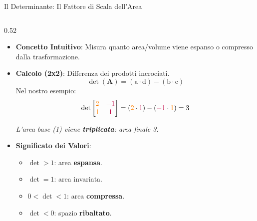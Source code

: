 \documentclass[aspectratio=169, 10pt]{beamer}
\begin{document}
\begin{frame}{Il Determinante: Il Fattore di Scala dell'Area}
    \begin{columns}[T] %
        
        \begin{column}{0.52\textwidth}
            \scriptsize
            \setlength\itemsep{0.2em}
            
            \begin{itemize}
                \item \textbf{Concetto Intuitivo}: 
                Misura quanto area/volume viene espanso o compresso dalla trasformazione.
                
                \item \textbf{Calcolo (2x2)}: 
                Differenza dei prodotti incrociati.
                \[
                    \det(\mathbf{A}) = (\text{a} \cdot \text{d}) - (\text{b} \cdot \text{c})
                \]
                \vspace{-0.45cm}
                Nel nostro esempio:
                \[
                \det\begin{bmatrix} \color{orange}2 & \color{purple}-1 \\ \color{orange}1 & \color{purple}1 \end{bmatrix}
                = (\color{orange}2\color{black}\cdot\color{purple}1\color{black}) - (\color{purple}-1\color{black}\cdot\color{orange}1\color{black})
                = 3
                \]
                
                \vspace{-0.25cm}
                \textit{L'area base (1) viene \textbf{triplicata}: area finale 3.}
                
                \item \textbf{Significato dei Valori}:
                \begin{itemize}
                    \setlength\itemsep{0.05em}
                    \item $\det > 1$: area \textbf{espansa}.
                    \item $\det = 1$: area invariata.
                    \item $0 < \det < 1$: area \textbf{compressa}.
                    \item $\det < 0$: spazio \textbf{ribaltato}.
                \end{itemize}


\end{itemize}
\end{column}
\end{columns}
\end{frame}
\end{document}
